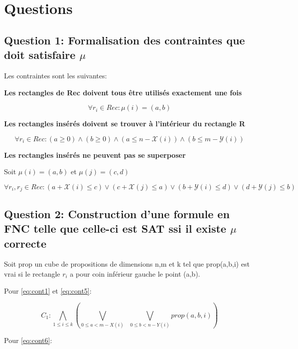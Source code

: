 \documentclass[a4paper,10pt]{article}
\begin{document}
\section{Questions}

\subsection{Question 1: Formalisation des contraintes que doit satisfaire $\mu$}

Les contraintes sont les suivantes: 

\textbf{Les rectangles de Rec doivent tous être utilisés exactement une fois}

\begin{equation}
\label{eq:cont1}
\forall r_i \in Rec : \mu(i) = (a,b)
\end{equation}

\textbf{Les rectangles insérés doivent se trouver à l'intérieur du rectangle R}

\begin{equation}
\label{eq:cont5}
\forall r_i \in Rec : (a \geq 0) \land (b \geq 0) \land (a \leq n - \mathcal{X}(i)) \land (b \leq m - \mathcal{Y}(i))
\end{equation}

\textbf{Les rectangles insérés ne peuvent pas se superposer}

Soit $\mu(i) = (a,b)$ et $\mu(j) = (c,d)$

\begin{equation}
\label{eq:cont6}
\forall r_i,r_j \in Rec : (a + \mathcal{X}(i) \leq c) \lor (c + \mathcal{X}(j) \leq a) \lor (b + \mathcal{Y}(i) \leq d) \lor (d + \mathcal{Y}(j) \leq b)
\end{equation}

\subsection{Question 2: Construction d'une formule en FNC telle que celle-ci est SAT ssi il existe $\mu$ correcte}

Soit prop un cube de propositions de dimensions n,m et k tel que prop(a,b,i) est vrai si le rectangle $r_i$ a pour coin inférieur gauche le point (a,b).

Pour \eqref{eq:cont1} et \eqref{eq:cont5}: 

$$C_1 : \bigwedge_{1 \leq i \leq k} ( \bigvee_{0 \leq a < m - X(i)}\;\; \bigvee_{0 \leq b < n - Y(i)} prop(a,b,i)) $$


Pour \eqref{eq:cont6}:
\end{document}
